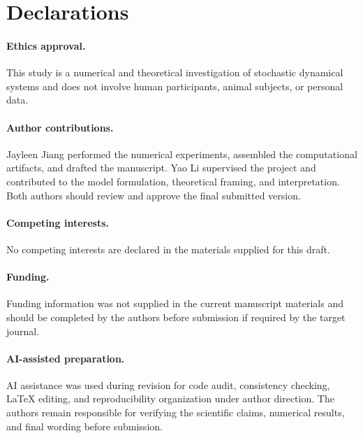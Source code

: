 \documentclass[11pt,a4paper]{article}
\theoremstyle{definition}
\numberwithin{equation}{section}   %
\begin{document}
\section*{Declarations}

\paragraph{Ethics approval.}
This study is a numerical and theoretical investigation of stochastic
dynamical systems and does not involve human participants, animal subjects, or
personal data.

\paragraph{Author contributions.}
Jayleen Jiang performed the numerical experiments, assembled the computational
artifacts, and drafted the manuscript. Yao Li supervised the project and
contributed to the model formulation, theoretical framing, and interpretation.
Both authors should review and approve the final submitted version.

\paragraph{Competing interests.}
No competing interests are declared in the materials supplied for this draft.

\paragraph{Funding.}
Funding information was not supplied in the current manuscript materials and
should be completed by the authors before submission if required by the target
journal.

\paragraph{AI-assisted preparation.}
AI assistance was used during revision for code audit, consistency checking,
LaTeX editing, and reproducibility organization under author direction. The
authors remain responsible for verifying the scientific claims, numerical
results, and final wording before submission.



\end{document}
